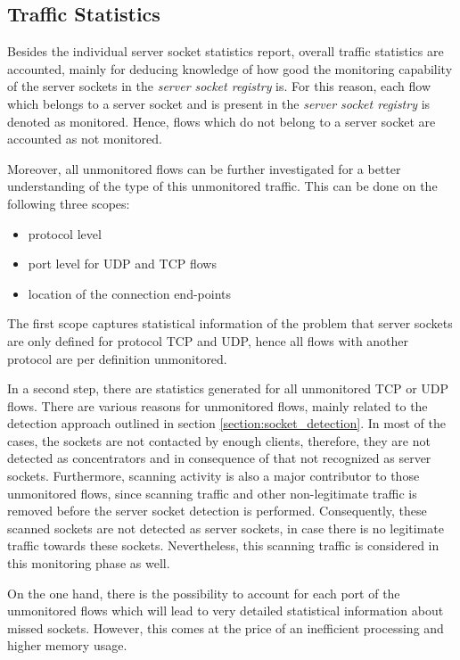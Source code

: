 \subsection{Traffic Statistics}

Besides the individual \gls{server socket} statistics report, overall traffic statistics are accounted, mainly for deducing knowledge of how good the monitoring capability of the \glspl{server socket} in the \emph{server socket registry} is. For this reason, each flow which belongs to a \gls{server socket} and is present in the \emph{server socket registry} is denoted as monitored. Hence, flows which do not belong to a \gls{server socket} are accounted as not monitored.

Moreover, all unmonitored flows can be further investigated for a better understanding of the type of this unmonitored traffic. This can be done on the following three scopes:
\begin{itemize}
	\item protocol level
	\item port level for \gls{UDP} and \gls{TCP} flows
	\item location of the connection end-points
\end{itemize}

The first scope captures statistical information of the problem that \glspl{server socket} are only defined for protocol \gls{TCP} and \gls{UDP}, hence all flows with another protocol are per definition unmonitored.

In a second step, there are statistics generated for all unmonitored \gls{TCP} or \gls{UDP} flows. There are various reasons for unmonitored flows, mainly related to the detection approach outlined in section \ref{section:socket_detection}. 
In most of the cases, the sockets are not contacted by enough clients, therefore, they are not detected as concentrators and in consequence of that not recognized as \glspl{server socket}. 
Furthermore, scanning activity is also a major contributor to those unmonitored flows, since scanning traffic and other non-legitimate traffic is removed before the \gls{server socket} detection is performed. Consequently, these scanned sockets are not detected as \glspl{server socket}, in case there is no legitimate traffic towards these sockets. Nevertheless, this scanning traffic is considered in this monitoring phase as well.

On the one hand, there is the possibility to account for each port of the unmonitored flows which will lead to very detailed statistical information about missed sockets. However, this comes at the price of an inefficient processing and higher memory usage.

